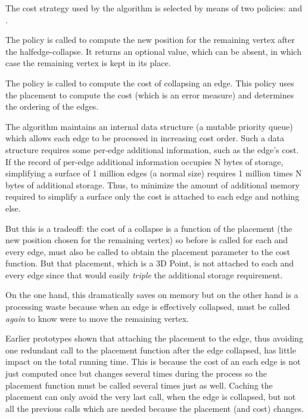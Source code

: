The cost strategy used by the algorithm is selected by means of two policies: 
 and . 

The  policy is called to compute the new position
for the remaining vertex after the halfedge-collapse. It returns
an optional value, which can be absent, in which case the 
remaining vertex is kept in its place.

The  policy is called to compute the cost
of collapsing an edge. This policy uses the placement to compute
the cost (which is an error measure) and determines the 
ordering of the edges.

The algorithm maintains an internal data structure (a mutable priority queue)
which allows each edge to be processed in increasing cost order. Such a data structure
requires some per-edge additional information, such as the edge's cost.
If the record of per-edge additional information occupies N bytes of storage,
simplifying a surface of 1 million edges (a normal size) requires 1 million times N bytes
of additional storage. Thus, to minimize the amount of additional memory required to
simplify a surface only the cost is attached to each edge and nothing else.

But this is a tradeoff: the cost of a collapse is a function of the placement
(the new position chosen for the remaining vertex) so before 
is called for each and every edge,  must also be called to obtain
the placement parameter to the cost function.
But that placement, which is a 3D Point, is not attached to each and every edge since
that would easily {\em triple} the additional storage requirement.

On the one hand, this dramatically saves on memory but on the other hand is
a processing waste because when an edge is effectively collapsed,  
must be called {\em again} to know were to move the remaining vertex.

Earlier prototypes shown that attaching the placement to the edge, thus avoiding one
redundant call to the placement function after the edge collapsed, has little 
impact on the total running time. This is because the cost of an each edge is not just
computed once but changes several times during the process so the placement function
must be called several times just as well. Caching the placement can only avoid the 
very last call, when the edge is collapsed, but not all the previous calls which
are needed because the placement (and cost) changes.

